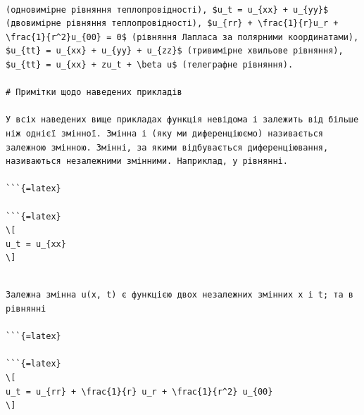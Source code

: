 \documentclass[
]{article}
\begin{document}
\begin{verbatim}

(одновимірне рівняння теплопровідності), $u_t = u_{xx} + u_{yy}$ (двовимірне рівняння теплопровідності), $u_{rr} + \frac{1}{r}u_r + \frac{1}{r^2}u_{00} = 0$ (рівняння Лапласа за полярними координатами), $u_{tt} = u_{xx} + u_{yy} + u_{zz}$ (тривимірне хвильове рівняння), $u_{tt} = u_{xx} + zu_t + \beta u$ (телеграфне рівняння).

# Примітки щодо наведених прикладів

У всіх наведених вище прикладах функція невідома і залежить від більше ніж однієї змінної. Змінна і (яку ми диференціюємо) називається залежною змінною. Змінні, за якими відбувається диференціювання, називаються незалежними змінними. Наприклад, у рівнянні.

```{=latex}

```{=latex}
\[
u_t = u_{xx}
\]
\end{verbatim}

\begin{verbatim}

Залежна змінна u(x, t) є функцією двох незалежних змінних x і t; та в рівнянні

```{=latex}

```{=latex}
\[
u_t = u_{rr} + \frac{1}{r} u_r + \frac{1}{r^2} u_{00}
\]
\end{verbatim}
\end{document}
